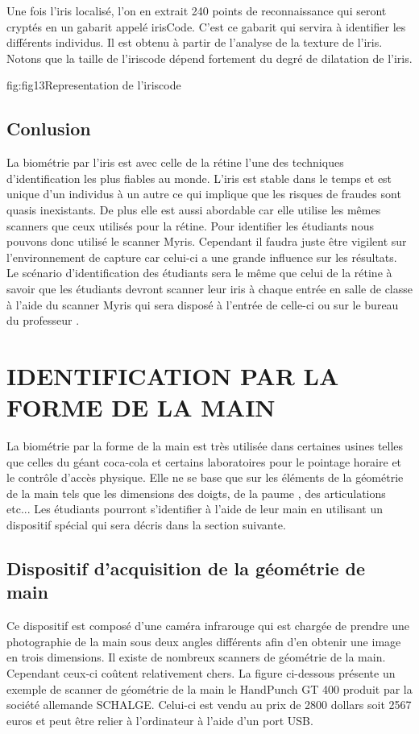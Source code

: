 \documentclass[overfullbox]{polytech/polytech}
\begin{document}
Une fois l'iris localisé, l'on en extrait 240 points de reconnaissance qui seront cryptés en un gabarit appelé irisCode. C'est ce gabarit qui servira à identifier les différents individus. Il est obtenu à partir de l'analyse de la texture de l'iris. Notons que la taille de l'iriscode dépend fortement du degré de dilatation de l'iris.

\begin{Figure}{fig:fig13}{Representation de l'iriscode}
\end{Figure}


\subsection{Conlusion} 
La biométrie par l'iris est avec celle de la rétine l'une des techniques d'identification les plus fiables au monde.  L'iris est stable dans le temps et est unique d'un individus à un autre ce qui implique que les risques de fraudes sont quasis inexistants. De plus elle est aussi abordable car elle utilise les mêmes scanners que ceux utilisés pour la rétine. Pour identifier les étudiants nous pouvons donc utilisé le scanner Myris. Cependant il faudra juste être vigilent sur l'environnement de capture car celui-ci a une grande influence sur les résultats. Le scénario d'identification des étudiants sera le même que celui de la rétine à savoir que les étudiants devront scanner leur iris à chaque entrée en salle de classe à l'aide du scanner Myris qui sera disposé à l'entrée de celle-ci ou sur le bureau du professeur . 


\section{IDENTIFICATION PAR LA FORME DE LA MAIN}

La biométrie par la forme de la main est très utilisée dans certaines usines telles que celles du géant coca-cola et certains laboratoires pour le pointage horaire et le contrôle d'accès physique. Elle ne se base que sur les éléments de la géométrie de la main tels que les dimensions des doigts, de la paume , des articulations etc... Les étudiants  pourront s'identifier à l'aide de leur main en utilisant un dispositif spécial qui sera décris dans la section suivante.

\subsection{Dispositif d'acquisition de la géométrie de main}
Ce dispositif est composé d'une caméra infrarouge qui est chargée de prendre une photographie de la main sous deux angles différents afin d'en obtenir une image en trois dimensions. Il existe de nombreux scanners de géométrie de la main. Cependant ceux-ci coûtent relativement chers. La figure ci-dessous présente un exemple de scanner de géométrie de la main le HandPunch GT 400 produit par la société allemande SCHALGE. Celui-ci est vendu au prix de 2800 dollars soit 2567 euros et peut être relier à l'ordinateur à l'aide d'un port USB.
\end{document}
